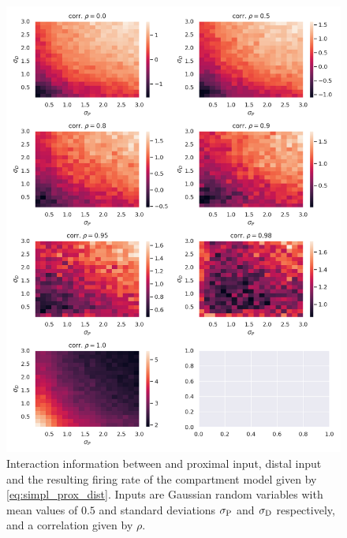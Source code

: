 \documentclass[10pt,a4paper,draft]{article}
\begin{document}
\begin{figure}
	\centering
	\includegraphics[width=\textwidth]{./figures/interaction_info_comp_mod.png}
	\caption{Interaction information between and proximal input, distal input and the resulting firing rate of the compartment model given by \eqref{eq:simpl_prox_dist}. Inputs are Gaussian random variables with mean values of $0.5$ and standard deviations $\sigma_{\rm P}$ and $\sigma_{\rm D}$ respectively, and a correlation given by $\rho$.}
	\label{fig:interact_inf}
\end{figure}

  


\end{document}

